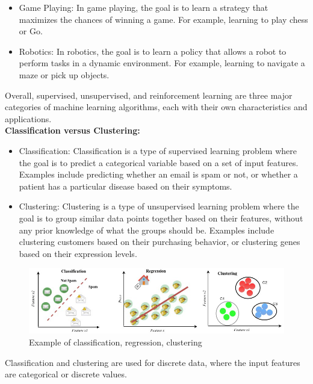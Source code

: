 \documentclass{article}
\begin{document}
\begin{itemize}
\item Game Playing: In game playing, the goal is to learn a strategy that maximizes the chances of winning a game. For example, learning to play chess or Go.
\item Robotics: In robotics, the goal is to learn a policy that allows a robot to perform tasks in a dynamic environment. For example, learning to navigate a maze or pick up objects.
\end{itemize}
Overall, supervised, unsupervised, and reinforcement learning are three major categories of machine learning algorithms, each with their own characteristics and applications.\\
\textbf{Classification versus Clustering:}
\begin{itemize}
\item Classification: Classification is a type of supervised learning problem where the goal is to predict a categorical variable based on a set of input features. Examples include predicting whether an email is spam or not, or whether a patient has a particular disease based on their symptoms.
\item Clustering: Clustering is a type of unsupervised learning problem where the goal is to group similar data points together based on their features, without any prior knowledge of what the groups should be. Examples include clustering customers based on their purchasing behavior, or clustering genes based on their expression levels.
\end{itemize}
\begin{figure}[!ht]
    \centering
    \includegraphics[width=\textwidth]{./images/p50_img275.png}
    \caption{Example of classification, regression, clustering}
\end{figure}
Classification and clustering are used for discrete data, where the input features are categorical or discrete values.\\
\end{document}
